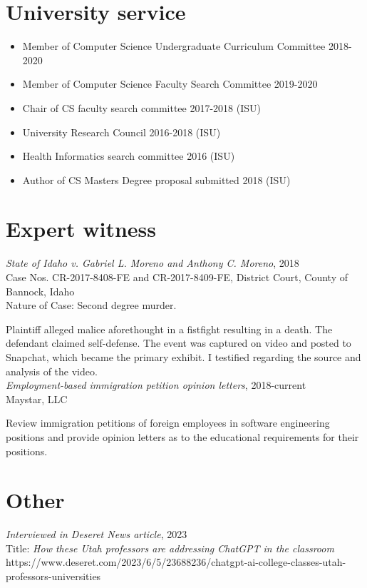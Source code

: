 \documentclass[margin,line]{res}
\begin{document}
\begin{resume}
\section{\sc University service}
\begin{itemize}[label={},leftmargin=0mm]
  \setlength\itemsep{0em}
  \item Member of Computer Science Undergraduate Curriculum Committee 2018-2020
  \item Member of Computer Science Faculty Search Committee 2019-2020
  \item Chair of CS faculty search committee 2017-2018 (ISU)
  \item University Research Council 2016-2018 (ISU)
  \item Health Informatics search committee 2016 (ISU)
  \item Author of CS Masters Degree proposal submitted 2018 (ISU)
\end{itemize}

\begin{LONG}

\section{\sc Expert witness}
\textit{State of Idaho v. Gabriel L. Moreno and Anthony C. Moreno}, 2018 \\
Case Nos. CR-2017-8408-FE and CR-2017-8409-FE, District Court, County of Bannock, Idaho \\
Nature of Case: Second degree murder.
\par \hangindent=0.7cm \parindent=0.7cm \parskip=0.0cm Plaintiff alleged malice aforethought in a fistfight resulting in a death. The defendant claimed self-defense. The event was captured on video and posted to Snapchat, which became the primary exhibit. I testified regarding the source and analysis of the video.\\

\parindent=0.0cm \textit{Employment-based immigration petition opinion letters}, 2018-current \\
Maystar, LLC
\par \hangindent=0.7cm \parindent=0.7cm \parskip=0.0cm Review immigration petitions of foreign employees in software engineering positions and provide opinion letters as to the educational requirements for their positions.

\section{\sc Other}
\parindent=0.0cm \textit{Interviewed in Deseret News article}, 2023\\
Title: \textit{How these Utah professors are addressing ChatGPT in the classroom}\\
https://www.deseret.com/2023/6/5/23688236/chatgpt-ai-college-classes-utah-professors-universities


\end{LONG}
\end{resume}
\end{document}

